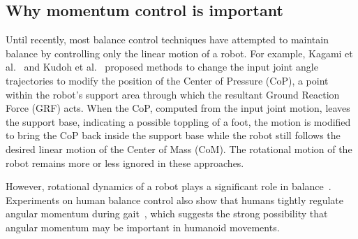 \documentclass{llncs}
\begin{document}
\subsection{Why momentum control is important}


Until recently, most balance control techniques
have attempted to maintain balance by controlling
only the linear motion of a robot.
For example, Kagami et al.~\cite{Kagami00} and
Kudoh et al.~\cite{Kudoh02} proposed methods to change
the input joint angle trajectories to modify the position of the
Center of Pressure (CoP), a point within the robot's support area through
which the resultant Ground Reaction Force (GRF) acts.
When the CoP, computed from the input joint motion, leaves the
support base, indicating a possible toppling of a foot,
the motion is modified to bring the CoP back inside the
support base while the robot still follows the desired linear
motion of the Center of Mass (CoM). The rotational motion of the
robot remains more or less ignored in these approaches.

However, rotational dynamics of a robot plays a
significant role in balance~\cite{KLKK05}.
Experiments on human balance control also show that
humans tightly regulate angular momentum during gait~\cite{PHH04},
which suggests the strong possibility that angular momentum
may be important in humanoid movements.
\end{document}
